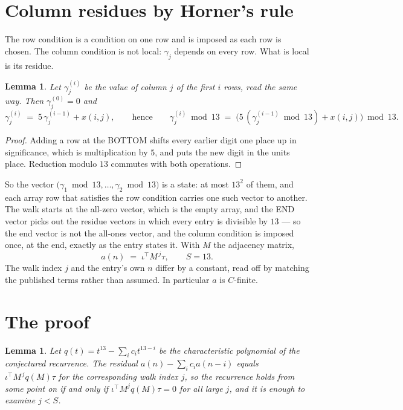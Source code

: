 \documentclass[11pt,a4paper]{article}
\theoremstyle{plain}
\newtheorem{lemma}[theorem]{Lemma}
\theoremstyle{definition}
\begin{document}
\section{Column residues by Horner's rule}

The row condition is a condition on one row and is imposed as each row is chosen. The column
condition is not local: $\gamma_j$ depends on every row. What is local is its residue.

\begin{lemma}\label{lem:horner}
Let $\gamma_j^{(i)}$ be the value of column $j$ of the first $i$ rows, read the same way.
Then $\gamma_j^{(0)}=0$ and
\[
\gamma_j^{(i)}\;=\;5\,\gamma_j^{(i-1)}+x(i,j),
\qquad\text{hence}\qquad
\gamma_j^{(i)}\bmod 13\;=\;
\bigl(5\,(\gamma_j^{(i-1)}\bmod 13)+x(i,j)\bigr)\bmod 13 .
\]
\end{lemma}

\begin{proof}
Adding a row at the BOTTOM shifts every earlier digit one place up in significance, which is
multiplication by $5$, and puts the new digit in the units place. Reduction modulo
$13$ commutes with both operations.
\end{proof}

So the vector $\bigl(\gamma_1\bmod 13,\dots,\gamma_{2}\bmod
13\bigr)$ is a state: at most $13^{2}$ of them, and each array row
that satisfies the row condition carries one such vector to another. The walk starts at the
all-zero vector, which is the empty array, and the END vector picks out the residue vectors in
which every entry is divisible by $13$ --- so the end vector is not the all-ones
vector, and the column condition is imposed once, at the end, exactly as the entry states it.
With $M$ the adjacency matrix,
\[
a(n)\;=\;\iota^{\!\top}M^{\,j}\tau ,\qquad S=13.
\]
The walk index $j$ and the entry's own $n$ differ by a constant, read off by matching the
published terms rather than assumed. In particular $a$ is $C$-finite.

\section{The proof}

\begin{lemma}\label{lem:crit}
Let $q(t)=t^{13}-\sum_i c_it^{13-i}$ be the characteristic polynomial of the
conjectured recurrence. The residual $a(n)-\sum_ic_ia(n-i)$ equals
$\iota^{\!\top}M^{\,j}q(M)\tau$ for the corresponding walk index $j$, so the recurrence
holds from some point on if and only if $\iota^{\!\top}M^{j}q(M)\tau=0$ for all large $j$,
and it is enough to examine $j<S$.
\end{lemma}
\end{document}
